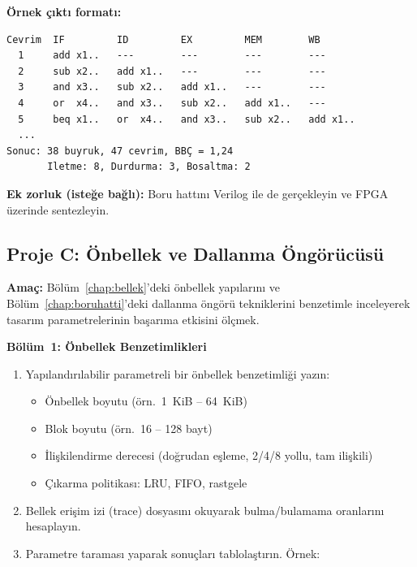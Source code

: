 \textbf{Örnek çıktı formatı:}
\begin{lstlisting}[numbers=none, basicstyle=\ttfamily\footnotesize]
Cevrim  IF         ID         EX         MEM        WB
  1     add x1..   ---        ---        ---        ---
  2     sub x2..   add x1..   ---        ---        ---
  3     and x3..   sub x2..   add x1..   ---        ---
  4     or  x4..   and x3..   sub x2..   add x1..   ---
  5     beq x1..   or  x4..   and x3..   sub x2..   add x1..
  ...
Sonuc: 38 buyruk, 47 cevrim, BBÇ = 1,24
       Iletme: 8, Durdurma: 3, Bosaltma: 2
\end{lstlisting}

\textbf{Ek zorluk (isteğe bağlı):} Boru hattını Verilog ile de gerçekleyin ve FPGA üzerinde sentezleyin.


\subsection{Proje C: Önbellek ve Dallanma Öngörücüsü}
\label{sec:ekd-proje-c}

\textbf{Amaç:} Bölüm~\ref{chap:bellek}'deki önbellek yapılarını ve Bölüm~\ref{chap:boruhatti}'deki dallanma öngörü tekniklerini benzetimle inceleyerek tasarım parametrelerinin başarıma etkisini ölçmek.\smallskip

\textbf{Bölüm~1: Önbellek Benzetimlikleri}
\begin{enumerate}[leftmargin=2em]
    \item Yapılandırılabilir parametreli bir önbellek benzetimliği yazın:
    \begin{itemize}[leftmargin=1.5em]
        \item Önbellek boyutu (örn.\ 1~KiB -- 64~KiB)
        \item Blok boyutu (örn.\ 16 -- 128 bayt)
        \item İlişkilendirme derecesi (doğrudan eşleme, 2/4/8 yollu, tam ilişkili)
        \item Çıkarma politikası: LRU, FIFO, rastgele
    \end{itemize}
    \item Bellek erişim izi (trace) dosyasını okuyarak bulma/bulamama oranlarını hesaplayın.
    \item Parametre taraması yaparak sonuçları tablolaştırın. Örnek:
\end{enumerate}

